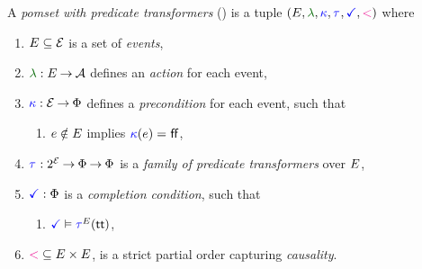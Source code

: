 A \emph{pomset with predicate transformers} (\PwT) %
is a tuple $(\aEvs, \labeling, \labelingForm, \aTr{}{}, \aTerm, {\lt})$ where
\begin{enumerate}[,label=(\textsc{m}\arabic*),ref=\textsc{m}\arabic*]
\item \label{pom-E} 
  $E\subseteq\mathcal{E}$ is a set of \emph{events},
\item \label{pom-lambda} 
  $\labeling: \aEvs \fun \Act$ defines an \emph{action} for each event,
\item \label{pom-kappa} 
  ${\color{blue}\kappa}:\mathcal{E}\mathbin\rightarrow\Phi$ defines a \emph{precondition} for each event,
  such that
  \begin{enumerate}
  \item \label{pom-kappa-sat}
    $e\notin E$ implies ${\color{blue}\kappa}(e)=\mkern.6mu\mathsf{ff}\mkern.6mu$,
  \end{enumerate}
\item \label{pom-tau} 
  $\aTr{}{}:2^{\AllEvents}\fun\Formulae \fun\Formulae$ is a \emph{family of predicate transformers} over $E$, 
\item \label{pom-term} 
  $\aTerm:\Formulae$ is a \emph{completion condition}, such that 
  \begin{enumerate}
  \item \label{pom-term-tau}
    $\aTerm\rimplies\aTrAbbrv{\aEvs}{\TRUE}$,
  \end{enumerate}
\item \label{pom-le} 
  ${\mathrel{{\color{magenta}<}}} \subseteq E\times E$, is a strict partial order capturing
  \emph{causality}.
\end{enumerate}
